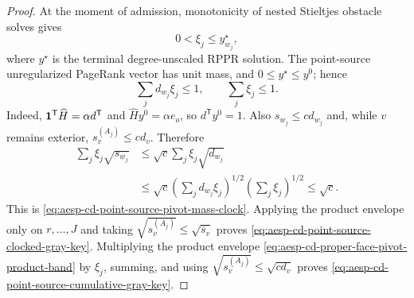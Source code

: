 \begin{proof}
At the moment of admission, monotonicity of nested Stieltjes obstacle solves
gives
\begin{equation*}
 0<\xi_j\leq y^\star_{w_j},
\end{equation*}
where \(y^\star\) is the terminal degree-unscaled RPPR solution.  The
point-source unregularized PageRank vector has unit mass, and
\(0\leq y^\star\leq y^0\); hence
\begin{equation*}
 \sum_jd_{w_j}\xi_j\leq1,
 \qquad
 \sum_j\xi_j\leq1.
\end{equation*}
Indeed,
\(\mathbf{1}^{\mathsf T}\widehat H=\alpha d^{\mathsf T}\) and
\(\widehat Hy^0=\alpha e_o\), so \(d^{\mathsf T}y^0=1\).
Also \(s_{w_j}\leq cd_{w_j}\) and, while \(v\) remains exterior,
\(s_v^{(A_j)}\leq cd_v\).  Therefore
\begin{align*}
 \sum_j\xi_j\sqrt{s_{w_j}}
 &\leq\sqrt c\sum_j\xi_j\sqrt{d_{w_j}}\\
 &\leq\sqrt c
 \left(\sum_jd_{w_j}\xi_j\right)^{1/2}
 \left(\sum_j\xi_j\right)^{1/2}
 \leq\sqrt c.
\end{align*}
This is
\cref{eq:aesp-cd-point-source-pivot-mass-clock}.  Applying the product
envelope only on \(r,\ldots,J\) and taking
\(\sqrt{s_v^{(A_j)}}\leq\sqrt{\overline s_v}\) proves
\cref{eq:aesp-cd-point-source-clocked-gray-key}.
Multiplying the product envelope
\cref{eq:aesp-cd-proper-face-pivot-product-band} by \(\xi_j\), summing,
and using \(\sqrt{s_v^{(A_j)}}\leq\sqrt{cd_v}\) proves
\cref{eq:aesp-cd-point-source-cumulative-gray-key}.
\end{proof}

